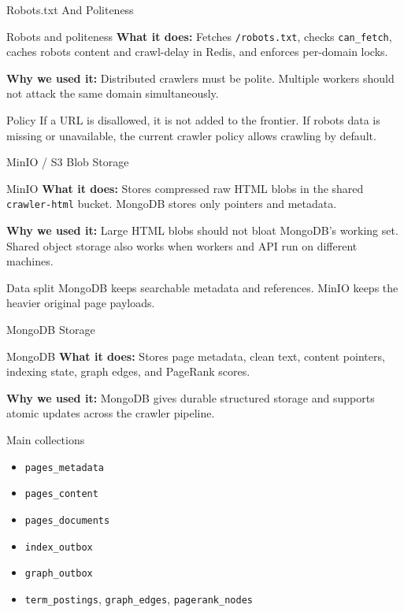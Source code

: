 \documentclass[aspectratio=169,11pt]{beamer}
\newcommand{\component}[3]{%
  \begin{block}{#1}
    \textbf{What it does:} #2

    \vspace{0.35em}
    \textbf{Why we used it:} #3
  \end{block}
}
\begin{document}
\begin{frame}{Robots.txt And Politeness}
  \component{Robots and politeness}
  {Fetches \texttt{/robots.txt}, checks \texttt{can\_fetch}, caches robots content and crawl-delay in Redis, and enforces per-domain locks.}
  {Distributed crawlers must be polite. Multiple workers should not attack the same domain simultaneously.}

  \begin{block}{Policy}
    If a URL is disallowed, it is not added to the frontier. If robots data is missing or unavailable, the current crawler policy allows crawling by default.
  \end{block}
\end{frame}

\begin{frame}{MinIO / S3 Blob Storage}
  \component{MinIO}
  {Stores compressed raw HTML blobs in the shared \texttt{crawler-html} bucket. MongoDB stores only pointers and metadata.}
  {Large HTML blobs should not bloat MongoDB's working set. Shared object storage also works when workers and API run on different machines.}

  \begin{block}{Data split}
    MongoDB keeps searchable metadata and references. MinIO keeps the heavier original page payloads.
  \end{block}
\end{frame}

\begin{frame}{MongoDB Storage}
  \small
  \component{MongoDB}
  {Stores page metadata, clean text, content pointers, indexing state, graph edges, and PageRank scores.}
  {MongoDB gives durable structured storage and supports atomic updates across the crawler pipeline.}

  \begin{block}{Main collections}
    \begin{itemize}
      \item \texttt{pages\_metadata}
      \item \texttt{pages\_content}
      \item \texttt{pages\_documents}
      \item \texttt{index\_outbox}
      \item \texttt{graph\_outbox}
      \item \texttt{term\_postings}, \texttt{graph\_edges}, \texttt{pagerank\_nodes}
    \end{itemize}
  \end{block}
\end{frame}
\end{document}

